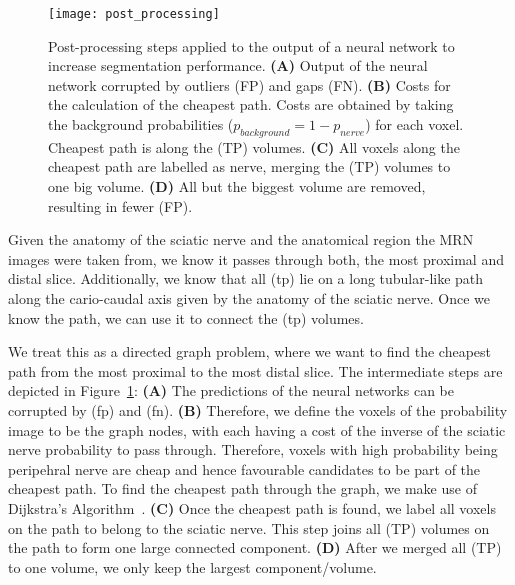 \begin{figure}[htbp]	
	\texttt{[image: post\_processing]}
    \caption[Post-processing]{Post-processing steps applied to the output of a neural network to increase segmentation performance. \textbf{(A)} Output of the neural network corrupted by outliers (FP) and gaps (FN). \textbf{(B)} Costs for the calculation of the cheapest path. Costs are obtained by taking the background probabilities ($p_{background} = 1 - p_{nerve}$) for each voxel. Cheapest path is along the (TP) volumes. \textbf{(C)} All voxels along the cheapest path are labelled as nerve, merging the (TP) volumes to one big volume. \textbf{(D)} All but the biggest volume are removed, resulting in fewer (FP).}
    \label{fig:post_processing}
\end{figure}
Given the anatomy of the sciatic nerve and the anatomical region the MRN images were taken from, we know it passes through both, the most proximal and distal slice. Additionally, we know that all (\acrshort{tp}) lie on a long tubular-like path along the cario-caudal axis given by the anatomy of the sciatic nerve. Once we know the path, we can use it to connect the (\acrshort{tp}) volumes.

We treat this as a directed graph problem, where we want to find the cheapest path from the most proximal to the most distal slice. The intermediate steps are depicted in Figure~\ref{fig:post_processing}: \textbf{(A)} The predictions of the neural networks can be corrupted by (\acrshort{fp}) and (\acrshort{fn}). \textbf{(B)} Therefore, we define the voxels of the probability image to be the graph nodes, with each having a cost of the inverse of the sciatic nerve probability to pass through. Therefore, voxels with high probability being peripehral nerve are cheap and hence favourable candidates to be part of the cheapest path. To find the cheapest path through the graph, we make use of Dijkstra's Algorithm~\cite{Dijkstra1959AGraphs}. \textbf{(C)} Once the cheapest path is found, we label all voxels on the path to belong to the sciatic nerve. This step joins all (TP) volumes on the path to form one large connected component. \textbf{(D)} After we merged all (TP) to one volume, we only keep the largest component/volume.

